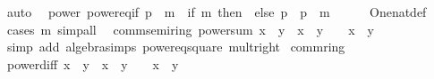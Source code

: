 \begin{isabellebody}
\ auto%
\endisatagproof
{\isafoldproof}%
%
\isadelimproof
\isanewline
%
\endisadelimproof
\isanewline
{}\isamarkupfalse%
\ {\isacharparenleft}{\kern0pt}\ power{\isacharparenright}{\kern0pt}\ power{\isacharunderscore}{\kern0pt}eq{\isacharunderscore}{\kern0pt}if{\isacharcolon}{\kern0pt}\ {\isachardoublequoteopen}p\ {\isacharcircum}{\kern0pt}\ m\ {\isacharequal}{\kern0pt}\ {\isacharparenleft}{\kern0pt}if\ m{\isacharequal}{\kern0pt}{}\ then\ {}\ else\ p\ {\isacharasterisk}{\kern0pt}\ {\isacharparenleft}{\kern0pt}p\ {\isacharcircum}{\kern0pt}\ {\isacharparenleft}{\kern0pt}m\ {\isacharminus}{\kern0pt}\ {}{\isacharparenright}{\kern0pt}{\isacharparenright}{\kern0pt}{\isacharparenright}{\kern0pt}{\isachardoublequoteclose}\isanewline
%
\isadelimproof
\ \ %
\endisadelimproof
%
\isatagproof
{}\isamarkupfalse%
\ One{\isacharunderscore}{\kern0pt}nat{\isacharunderscore}{\kern0pt}def\ \isamarkupfalse%
\ {\isacharparenleft}{\kern0pt}cases\ m{\isacharparenright}{\kern0pt}\ simp{\isacharunderscore}{\kern0pt}all%
\endisatagproof
{\isafoldproof}%
%
\isadelimproof
\isanewline
%
\endisadelimproof
\isanewline
{}\isamarkupfalse%
\ {\isacharparenleft}{\kern0pt}\ comm{\isacharunderscore}{\kern0pt}semiring{\isacharunderscore}{\kern0pt}{}{\isacharparenright}{\kern0pt}\ power{}{\isacharunderscore}{\kern0pt}sum{\isacharcolon}{\kern0pt}\ {\isachardoublequoteopen}{\isacharparenleft}{\kern0pt}x\ {\isacharplus}{\kern0pt}\ y{\isacharparenright}{\kern0pt}\ {\isacharequal}{\kern0pt}\ x\ {\isacharplus}{\kern0pt}\ y\ {\isacharplus}{\kern0pt}\ {}\ {\isacharasterisk}{\kern0pt}\ x\ {\isacharasterisk}{\kern0pt}\ y{\isachardoublequoteclose}\isanewline
%
\isadelimproof
\ \ %
\endisadelimproof
%
\isatagproof
{}\isamarkupfalse%
\ {\isacharparenleft}{\kern0pt}simp\ add{\isacharcolon}{\kern0pt}\ algebra{\isacharunderscore}{\kern0pt}simps\ power{}{\isacharunderscore}{\kern0pt}eq{\isacharunderscore}{\kern0pt}square\ mult{\isacharunderscore}{\kern0pt}{}{\isacharunderscore}{\kern0pt}right{\isacharparenright}{\kern0pt}%
\endisatagproof
{\isafoldproof}%
%
\isadelimproof
\isanewline
%
\endisadelimproof
\isanewline
{}\isamarkupfalse%
\ comm{\isacharunderscore}{\kern0pt}ring{\isacharunderscore}{\kern0pt}{}\isanewline
{}\isanewline
\isanewline
{}\isamarkupfalse%
\ power{}{\isacharunderscore}{\kern0pt}diff{\isacharcolon}{\kern0pt}\ {\isachardoublequoteopen}{\isacharparenleft}{\kern0pt}x\ {\isacharminus}{\kern0pt}\ y{\isacharparenright}{\kern0pt}\ {\isacharequal}{\kern0pt}\ x\ {\isacharplus}{\kern0pt}\ y\ {\isacharminus}{\kern0pt}\ {}\ {\isacharasterisk}{\kern0pt}\ x\ {\isacharasterisk}{\kern0pt}\ y{\isachardoublequoteclose}\isanewline

\end{isabellebody}
